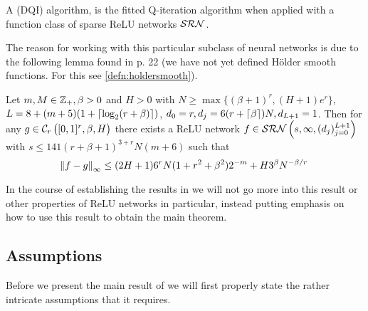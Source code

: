\begin{defn}
  A  (DQI) algorithm,
  is the fitted Q-iteration algorithm when applied with a function class
  of sparse ReLU networks $\mathcal{SRN}$.
\end{defn}

The reason for working with this particular subclass of neural networks
is due to the following lemma found in
 p. 22 (we have not yet defined Hölder smooth functions.
For this see \cref{defn:holdersmooth}).

\begin{lem}
  Let $m,M \in \mathbb{Z}_+, \beta > 0$ and $H>0$
  with $N \geq \max\{(\beta + 1)^r, (H + 1) e^r\}$,
  $L = 8 + (m + 5) (1 + \lceil\log_2(r + \beta)\rceil)$, 
  $d_0 = r, d_j = 6(r + \lceil\beta\rceil) N, d_{L+1} = 1$.
  Then for any $g \in \mathcal{C}_r \left( [0,1]^r, \beta, H \right)$
  there exists a ReLU network
  $f \in \mathcal{SRN}\left(s, \infty, (d_j)_{j=0}^{L+1} \right)$
  with $s \leq 141 (r + \beta + 1)^{3 + r} N (m+6)$
  such that
  \begin{equation*}
    \norm{f - g}_\infty \leq (2 H + 1) 6^r N (1 + r^2 + \beta^2) 2^{-m}
    + H 3^{\beta} N^{-\beta/r}
  \end{equation*}
  \label{lem:holderapprox} 
\end{lem} 
\vspace*{-\baselineskip}

In the course of establishing the results in  we will not go
more into this result or other properties of ReLU networks in particular,
instead putting emphasis on how to use this result to obtain the main
theorem.

\subsection{Assumptions}

Before we present the main result of 
we will first properly state the rather
intricate assumptions that it requires.


